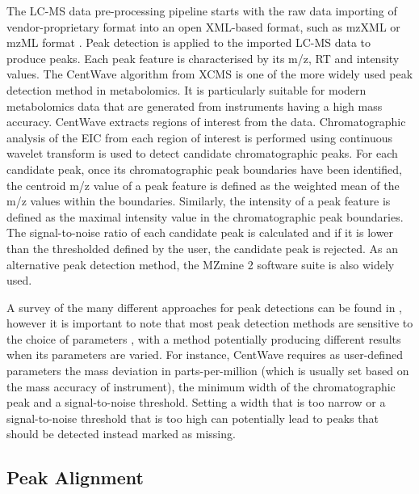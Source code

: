 The LC-MS data pre-processing pipeline starts with the raw data importing of vendor-proprietary format into an open XML-based format, such as mzXML \cite{Pedrioli2004} or mzML format \cite{martens2011mzml}. Peak detection is applied to the imported LC-MS data to produce peaks. Each peak feature is characterised by its m/z, RT and intensity values. The CentWave algorithm \cite{Tautenhahn2008} from XCMS is one of the more widely used peak detection method in metabolomics. It is particularly suitable for modern metabolomics data that are generated from instruments having a high mass accuracy. CentWave extracts regions of interest from the data. Chromatographic analysis of the EIC from each region of interest is performed using continuous wavelet transform is used to detect candidate chromatographic peaks. For each candidate peak, once its chromatographic peak boundaries have been identified, the centroid m/z value of a peak feature is defined as the weighted mean of the m/z values within the boundaries. Similarly, the intensity of a peak feature is defined as the maximal intensity value in the chromatographic peak boundaries. The signal-to-noise ratio of each candidate peak is calculated and if it is lower than the thresholded defined by the user, the candidate peak is rejected. As an alternative peak detection method, the MZmine 2 \cite{Pluskal2010} software suite is also widely used. 

A survey of the many different approaches for peak detections can be found in \cite{Katajamaa2007,Castillo2011,Alonso2015}, however it is important to note that most peak detection methods are sensitive to the choice of parameters \cite{Tautenhahn2008}, with a method potentially producing different results when its parameters are varied. For instance, CentWave requires as user-defined parameters the mass deviation in parts-per-million (which is usually set based on the mass accuracy of instrument), the minimum width of the chromatographic peak and a signal-to-noise threshold. Setting a width that is too narrow or a signal-to-noise threshold that is too high can potentially lead to peaks that should be detected instead marked as missing. 

\subsection{Peak Alignment\label{sub:alignment-tools}}

